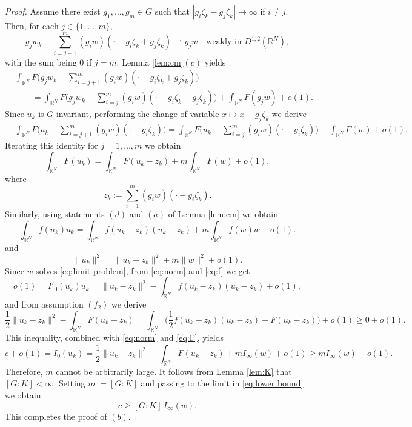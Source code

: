 \documentclass[10pt,a4paper]{amsart}
\def\irn{\int_{\r^N}}
\def\rh{\rightharpoonup}
\def\rn{\mathbb{R}^N}
\def\r{\mathbb{R}}
\begin{document}
\begin{proof}
Assume there exist $g_1,\ldots, g_m \in G$ such that $|g_i\zeta_k- g_j\zeta_k|\to\infty$ if $i \neq j$. Then, for each $j\in\{1,\ldots,m\}$,
$$g_j w_k - \sum_{i=j+1}^{m} (g_i w)(\cdot - g_i \zeta_k + g_j \zeta_k) \rh g_j  w \quad \text{weakly in \ } D^{1,2}(\rn),$$
with the sum being $0$ if $j=m$. Lemma \ref{lem:cm}$(c)$ yields
\begin{align*}
&\irn F\Big(g_jw_k - \sum_{i=j+1}^{m} (g_iw)(\cdot - g_i \zeta_k + g_j \zeta_k) \Big)\\
&\qquad= \irn F\Big(g_j w_k - \sum_{i=j}^{m} (g_iw)(\cdot - g_i \zeta_k + g_j \zeta_k)\Big) + \irn F(g_j w) + o(1).
\end{align*}
Since $u_k$  is $G$-invariant, performing the change of variable $x \mapsto x - g_j \zeta_k$ we derive
\begin{align*}
&\irn F\Big(u_k - \sum_{i=j+1}^{m} (g_i w)(\cdot - g_i \zeta_k ) \Big)= \irn F\Big(u_k - \sum_{i=j}^{m} (g_iw)(\cdot - g_i \zeta_k ) \Big) + \irn F(w) + o(1).
\end{align*}
Iterating this identity for $j= 1,\ldots, m$ we obtain
\begin{equation} \label{eq:F}
\irn F(u_k)=\irn F(u_k - z_k)+m\irn F(w) + o(1),
\end{equation}
where
$$z_k:=\sum_{i=1}^{m} (g_iw)(\cdot - g_i \zeta_k).$$
Similarly, using statements $(d)$ and $(a)$ of Lemma \ref{lem:cm} we obtain
\begin{equation} \label{eq:f}
\irn f(u_k)u_k=\irn f(u_k - z_k)(u_k - z_k)+m\irn f(w)w+o(1).
\end{equation}
and
\begin{equation}\label{eq:norm}
\|u_k\|^2 = \|u_k - z_k\|^2 + m \|w\|^2 + o(1).
\end{equation}
Since $w$ solves \eqref{eq:limit problem}, from \eqref{eq:norm} and \eqref{eq:f} we get
$$o(1)=I'_0(u_k)u_k=\|u_k-z_k\|^2-\irn f(u_k-z_k)(u_k-z_k)+o(1),$$
and from assumption $(f_2)$ we derive
$$\frac{1}{2}\|u_k-z_k\|^2-\irn F(u_k-z_k)=\irn\Big(\frac{1}{2}f(u_k-z_k)(u_k-z_k)-F(u_k-z_k)\Big)+o(1)\geq 0+o(1).$$
This inequality, combined with \eqref{eq:norm} and \eqref{eq:F}, yields
\begin{equation}\label{eq:lower bound}
c+o(1)=I_0(u_k)=\frac{1}{2}\|u_k-z_k\|^2-\irn F(u_k-z_k)+mI_\infty(w)+o(1)\geq mI_\infty(w)+o(1).
\end{equation}
Therefore, $m$ cannot be arbitrarily large. It follows from Lemma \ref{lem:K} that $[G:K]<\infty$. Setting $m:=[G:K]$ and passing to the limit in \eqref{eq:lower bound} we obtain
$$c\geq [G:K]\,I_\infty(w).$$
This completes the proof of $(b)$.
\end{proof}
\end{document}
